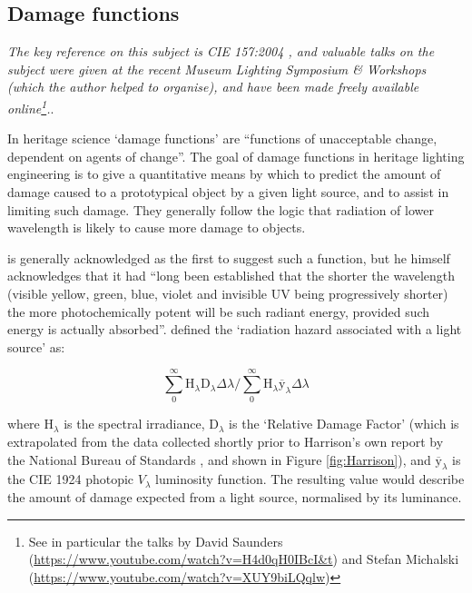 \subsection{Damage functions} \label{sec:DamageIndex}

\textit{The key reference on this subject is CIE 157:2004 \citep{cie_cie_2004}, and valuable talks on the subject were given at the recent Museum Lighting Symposium \& Workshops\citep{pokorska_book_2017} (which the author helped to organise), and have been made freely available online\footnote{See in particular the talks by David Saunders (\url{https://www.youtube.com/watch?v=H4d0qH0IBcI&t}) and Stefan Michalski (\url{https://www.youtube.com/watch?v=XUY9biLQqlw})}.}.

\bigskip

In heritage science `damage functions' are ``functions of unacceptable change, dependent on agents of change''\citep{strlic_damage_2013}. The goal of damage functions in heritage lighting engineering is to give a quantitative means by which to predict the amount of damage caused to a prototypical object by a given light source, and to assist in limiting such damage. They generally follow the logic that radiation of lower wavelength is likely to cause more damage to objects.

\citet{harrison_report_1953} is generally acknowledged as the first to suggest such a function, but he himself acknowledges that it had ``long been established that the shorter the wavelength (visible yellow, green, blue, violet and invisible UV being progressively shorter) the more photochemically potent will be such radiant energy, provided such energy is actually absorbed''. \citet[p.9]{harrison_report_1953} defined the `radiation hazard associated with a light source' as:

\begin{equation}
    \sum_{0}^{\infty} \mathrm{H}_{\lambda} \mathrm{D}_{\lambda} \Delta \lambda / \sum_{0}^{\infty} \mathrm{H}_{\lambda} \overline{\mathrm{y}}_{\lambda} \Delta \lambda
    \label{eq:Harrison}
\end{equation}

where $\mathrm{H}_{\lambda}$ is the spectral irradiance, $\mathrm{D}_{\lambda}$ is the `Relative Damage Factor' (which is extrapolated from the data collected shortly prior to Harrison's own report by the National Bureau of Standards \citep{national_bureau_of_standards_preservation_1951}, and shown in Figure \ref{fig:Harrison}), and $\overline{\mathrm{y}}_{\lambda}$ is the CIE 1924 photopic $V_{\lambda}$ luminosity function. The resulting value would describe the amount of damage expected from a light source, normalised by its luminance.

